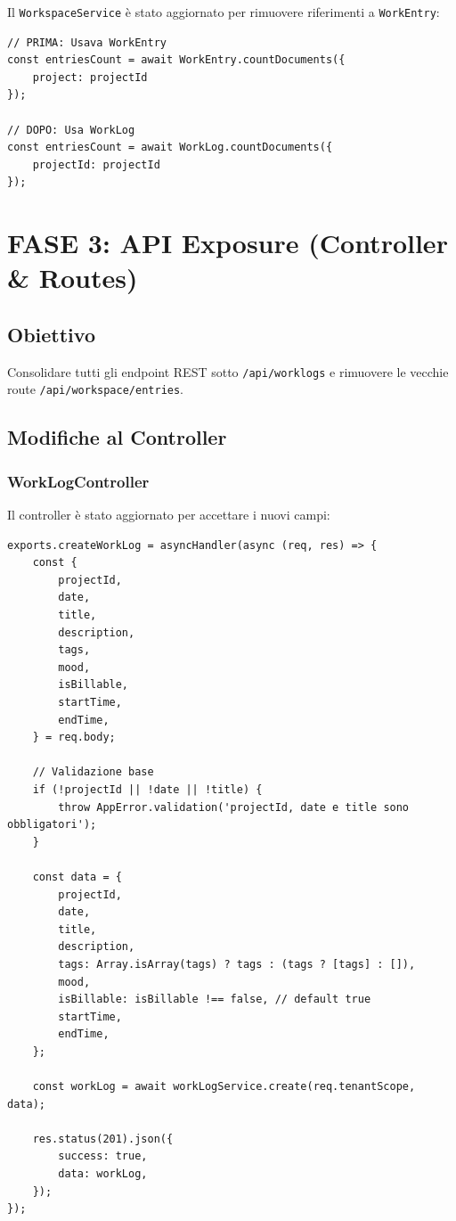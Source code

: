 \documentclass[11pt,a4paper]{article}
\begin{document}
Il \texttt{WorkspaceService} è stato aggiornato per rimuovere riferimenti a \texttt{WorkEntry}:

\begin{lstlisting}[caption=Aggiornamento WorkspaceService]
// PRIMA: Usava WorkEntry
const entriesCount = await WorkEntry.countDocuments({ 
    project: projectId 
});

// DOPO: Usa WorkLog
const entriesCount = await WorkLog.countDocuments({ 
    projectId: projectId 
});
\end{lstlisting}

\section{FASE 3: API Exposure (Controller \& Routes)}

\subsection{Obiettivo}

Consolidare tutti gli endpoint REST sotto \texttt{/api/worklogs} e rimuovere le vecchie route \texttt{/api/workspace/entries}.

\subsection{Modifiche al Controller}

\subsubsection{WorkLogController}

Il controller è stato aggiornato per accettare i nuovi campi:

\begin{lstlisting}[caption=createWorkLog Aggiornato]
exports.createWorkLog = asyncHandler(async (req, res) => {
    const {
        projectId,
        date,
        title,
        description,
        tags,
        mood,
        isBillable,
        startTime,
        endTime,
    } = req.body;
    
    // Validazione base
    if (!projectId || !date || !title) {
        throw AppError.validation('projectId, date e title sono obbligatori');
    }
    
    const data = {
        projectId,
        date,
        title,
        description,
        tags: Array.isArray(tags) ? tags : (tags ? [tags] : []),
        mood,
        isBillable: isBillable !== false, // default true
        startTime,
        endTime,
    };
    
    const workLog = await workLogService.create(req.tenantScope, data);
    
    res.status(201).json({
        success: true,
        data: workLog,
    });
});
\end{lstlisting}
\end{document}
